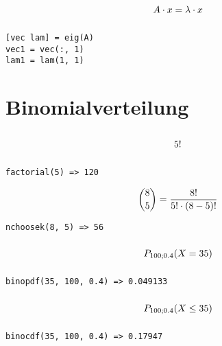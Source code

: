 \documentclass
[
  fontsize = 11pt,
  parskip  = half-,
  BCOR     = 0pt,
  DIV      = 11,
  ngerman
]
{scrartcl}
\begin{document}
\begin{minipage}{\mw}
  \begin{equation*}
    \vphantom{\bigg(}%
    A\cdot x=\lambda\cdot x
  \end{equation*}
\end{minipage}%
\hfill
\begin{minipage}{\cw}
\begin{verbatim}
[vec lam] = eig(A)
vec1 = vec(:, 1)
lam1 = lam(1, 1)
\end{verbatim}
\end{minipage}

\section{Binomialverteilung}
\begin{minipage}{\mw}
  \begin{equation*}
    \vphantom{\bigg(}%
    5!
  \end{equation*}
\end{minipage}%
\hfill
\begin{minipage}{\cw}
\begin{verbatim}
factorial(5) => 120
\end{verbatim}
\end{minipage}

\begin{minipage}{\mw}
  \begin{equation*}
    \vphantom{\bigg(}%
    \binom{8}{5}=\frac{8!}{5!\cdot(8-5)!}
  \end{equation*}
\end{minipage}%
\hfill
\begin{minipage}{\cw}
\begin{verbatim}
nchoosek(8, 5) => 56
\end{verbatim}
\end{minipage}

\begin{minipage}{\mw}
  \begin{equation*}
    \vphantom{\bigg(}%
    P_{100;\num{0.4}}(X=35)
  \end{equation*}
\end{minipage}%
\hfill
\begin{minipage}{\cw}
\begin{verbatim}
binopdf(35, 100, 0.4) => 0.049133
\end{verbatim}
\end{minipage}
\begin{minipage}{\mw}
  \begin{equation*}
    \vphantom{\bigg(}%
    P_{100;\num{0.4}}(X\leq35)
  \end{equation*}
\end{minipage}%
\hfill
\begin{minipage}{\cw}
\begin{verbatim}
binocdf(35, 100, 0.4) => 0.17947
\end{verbatim}
\end{minipage}

\end{document}

